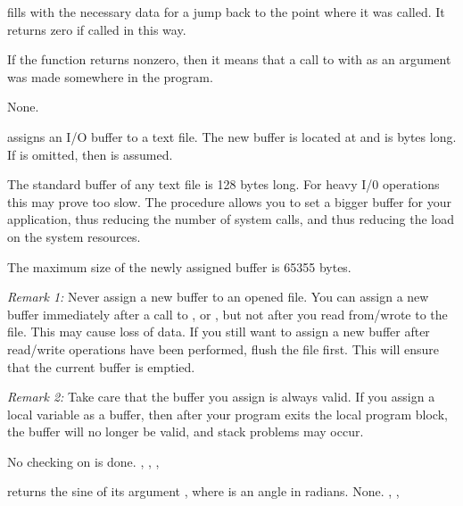 \documentclass{report}
\begin{document}
\html{}

{
 fills  with the necessary data for a jump back to the
point where it was called. It returns zero if called in this way.

If the function returns nonzero, then it means that a call to 
with  as an argument was made somewhere in the program.
}{None.}{}

\html{}


{ assigns an I/O buffer to a text file. The new buffer is
located at  and is  bytes long. If  is omitted,
then  is assumed.

The standard buffer of any text file is 128 bytes long. For heavy I/0
operations this may prove too slow. The  procedure allows
you to set a bigger buffer for your application, thus reducing the number of
system calls, and thus reducing the load on the system resources.

The maximum size of the newly assigned buffer is 65355 bytes.

{\em Remark 1:} Never assign a new buffer to an opened file. You can assign a
new buffer immediately after a call to ,  or
, but not after you read from/wrote to the file. This may cause
loss of data. If you still want to assign a new buffer after read/write
operations have been performed, flush the file first. This will ensure that
the current buffer is emptied.

{\em Remark 2:} Take care that the buffer you assign is always valid. If you
assign a local variable as a buffer, then after your program exits the local
program block, the buffer will no longer be valid, and stack problems may
occur.
}
{No checking on  is done.}
{, , , }

\html{}

{ returns the sine of its argument , where  is an
angle in radians.}
{None.}
{, , }

\html{}
\end{document}
